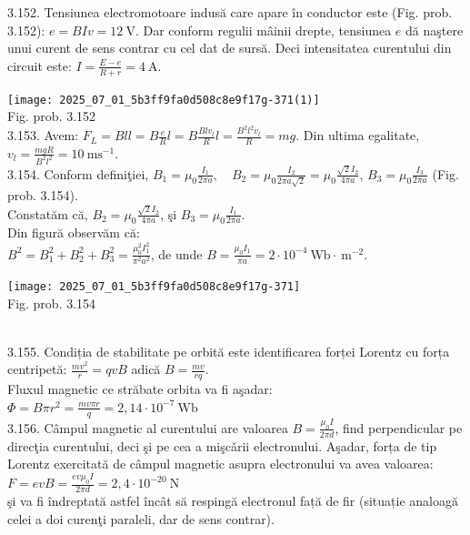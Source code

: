 3.152. Tensiunea electromotoare indusă care apare în conductor este (Fig. prob. 3.152): $e=B I v=12 \mathrm{~V}$. Dar conform regulii mâinii drepte, tensiunea $e$ dă naştere unui curent de sens contrar cu cel dat de sursă. Deci intensitatea curentului din circuit este: $I=\frac{E-e}{R+r}=4 \mathrm{~A}$.\\ \begin{center} \texttt{[image: 2025\_07\_01\_5b3ff9fa0d508c8e9f17g-371(1)]}\\ Fig. prob. 3.152 \\

3.153. Avem: $F_{L}=B l l=B \frac{e}{R} l=B \frac{B l v_{l}}{R} l=\frac{B^{2} l^{2} v_{l}}{R}=m g$. Din ultima egalitate, $v_{l}=\frac{m g R}{B^{2} l^{2}}=10 \mathrm{~ms}^{-1}$.\\

3.154. Conform definiţiei, $B_{1}=\mu_{0} \frac{I_{1}}{2 \pi a}, \quad B_{2}=\mu_{0} \frac{I_{2}}{2 \pi a \sqrt{2}}=\mu_{0} \frac{\sqrt{2} I_{2}}{4 \pi a}$, $B_{3}=\mu_{0} \frac{I_{3}}{2 \pi a}$ (Fig. prob. 3.154).\\ Constatăm că, $B_{2}=\mu_{0} \frac{\sqrt{2} I_{2}}{4 \pi a}$, şi $B_{3}=\mu_{0} \frac{I_{1}}{2 \pi a}$.\\ Din figură observăm că:\\ $B^{2}=B_{1}^{2}+B_{2}^{2}+B_{3}^{2}=\frac{\mu_{0}^{2} I_{1}^{2}}{\pi^{2} a^{2}}$, de unde $B=\frac{\mu_{0} I_{1}}{\pi a}=2 \cdot 10^{-4} \mathrm{~Wb} \cdot \mathrm{~m}^{-2}$.\\ \begin{center} \texttt{[image: 2025\_07\_01\_5b3ff9fa0d508c8e9f17g-371]}\\ Fig. prob. 3.154 \end{center}\\

3.155. Condiția de stabilitate pe orbită este identificarea forței Lorentz cu forța centripetă: $\frac{m v^{2}}{r}=q v B$ adică $B=\frac{m v}{r q}$.\\ Fluxul magnetic ce străbate orbita va fi aşadar:\\ $\Phi=B \pi r^{2}=\frac{m v \pi r}{q}=2,14 \cdot 10^{-7} \mathrm{~Wb}$\\

3.156. Câmpul magnetic al curentului are valoarea $B=\frac{\mu_{0} I}{2 \pi d}$, find perpendicular pe direcţia curentului, deci şi pe cea a mişcǎrii electronului. Aşadar, forța de tip Lorentz exercitată de câmpul magnetic asupra electronului va avea valoarea:\\ $F=e v B=\frac{e v \mu_{0} I}{2 \pi d}=2,4 \cdot 10^{-20} \mathrm{~N}$\\ şi va fi îndreptată astfel încât să respingă electronul față de fir (situație analoagă celei a doi curenţi paraleli, dar de sens contrar).\\


\end{center}
